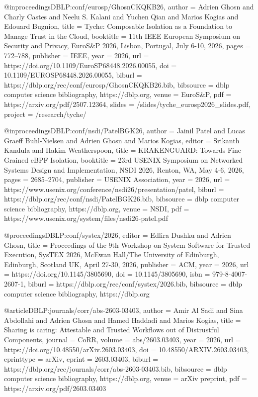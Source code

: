 
@inproceedings{DBLP:conf/eurosp/GhosnCKQKB26,
  author = {Adrien Ghosn and Charly Castes and Neelu S. Kalani and Yuchen Qian and Marios Kogias and Edouard Bugnion},
  title = {Tyche: Composable Isolation as a Foundation to Manage Trust in the Cloud},
  booktitle = {11th IEEE European Symposium on Security and Privacy, EuroS&P 2026, Lisbon, Portugal, July 6-10, 2026},
  pages = {772--788},
  publisher = {IEEE},
  year = {2026},
  url = {https://doi.org/10.1109/EuroSP68448.2026.00055},
  doi = {10.1109/EUROSP68448.2026.00055},
  biburl = {https://dblp.org/rec/conf/eurosp/GhosnCKQKB26.bib},
  bibsource = {dblp computer science bibliography, https://dblp.org},
  venue = {EuroS&P},
  pdf = {https://arxiv.org/pdf/2507.12364},
  slides = {/slides/tyche_eurosp2026_slides.pdf},
  project = {/research/tyche/}
}

@inproceedings{DBLP:conf/nsdi/PatelBGK26,
  author = {Jainil Patel and Lucas Graeff Buhl-Nielsen and Adrien Ghosn and Marios Kogias},
  editor = {Srikanth Kandula and Hakim Weatherspoon},
  title = {{KRAKENGUARD}: Towards Fine-Grained eBPF Isolation},
  booktitle = {23rd USENIX Symposium on Networked Systems Design and Implementation, NSDI 2026, Renton, WA, May 4-6, 2026},
  pages = {2685--2704},
  publisher = {USENIX Association},
  year = {2026},
  url = {https://www.usenix.org/conference/nsdi26/presentation/patel},
  biburl = {https://dblp.org/rec/conf/nsdi/PatelBGK26.bib},
  bibsource = {dblp computer science bibliography, https://dblp.org},
  venue = {NSDI},
  pdf = {https://www.usenix.org/system/files/nsdi26-patel.pdf}
}

@proceedings{DBLP:conf/systex/2026,
  editor = {Edlira Dushku and Adrien Ghosn},
  title = {Proceedings of the 9th Workshop on System Software for Trusted Execution, SysTEX 2026, McEwan Hall/The University of Edinburgh, Edinburgh, Scotland UK, April 27-30, 2026},
  publisher = {ACM},
  year = {2026},
  url = {https://doi.org/10.1145/3805690},
  doi = {10.1145/3805690},
  isbn = {979-8-4007-2607-1},
  biburl = {https://dblp.org/rec/conf/systex/2026.bib},
  bibsource = {dblp computer science bibliography, https://dblp.org}
}

@article{DBLP:journals/corr/abs-2603-03403,
  author = {Amir Al Sadi and Sina Abdollahi and Adrien Ghosn and Hamed Haddadi and Marios Kogias},
  title = {Sharing is caring: Attestable and Trusted Workflows out of Distrustful Components},
  journal = {CoRR},
  volume = {abs/2603.03403},
  year = {2026},
  url = {https://doi.org/10.48550/arXiv.2603.03403},
  doi = {10.48550/ARXIV.2603.03403},
  eprinttype = {arXiv},
  eprint = {2603.03403},
  biburl = {https://dblp.org/rec/journals/corr/abs-2603-03403.bib},
  bibsource = {dblp computer science bibliography, https://dblp.org},
  venue = {arXiv preprint},
  pdf = {https://arxiv.org/pdf/2603.03403}
}

